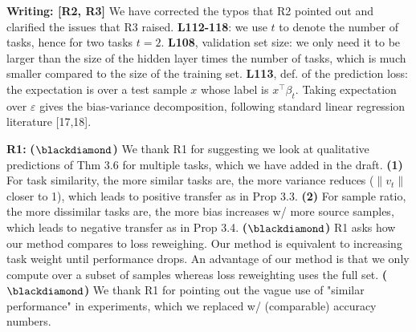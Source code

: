 \documentclass{article}
\begin{document}
\vspace{-0.025in}
\textbf{Writing: [R2, R3]}
We have corrected the typos that R2 pointed out and clarified the issues that R3 raised.
\textbf{L112-118}: we use $t$ to denote the number of tasks, hence for two tasks $t = 2$.
\textbf{L108}, validation set size: we only need it to be larger than the size of the hidden layer times the number of tasks, which is much smaller compared to the size of the training set.
\textbf{L113}, def. of the prediction loss: the expectation is over a test sample $x$ whose label is $x^{\top}\beta_t$.
Taking expectation over $\varepsilon$ gives  the bias-variance decomposition, following standard linear regression literature [17,18].

\vspace{-0.025in}
\textbf{R1:}
\textbf{($\blackdiamond$)} We thank R1 for suggesting we look at qualitative predictions of Thm 3.6 for multiple tasks, which we have added in the  draft.
\textbf{(1)} For task similarity, the more similar tasks are, the more variance reduces ($\|{v_t}\|$ closer to 1), which leads to positive transfer as in Prop 3.3.
\textbf{(2)} For sample ratio, the more dissimilar tasks are, the more bias increases w/ more source samples, which leads to negative transfer as in Prop 3.4.
\textbf{($\blackdiamond$)} R1 asks how our method compares to loss reweighing.
Our method is equivalent to increasing task weight until performance drops.
An advantage of our method is that we only compute over a subset of samples whereas loss reweighting uses the full set.
\textbf{($\blackdiamond$)} We thank R1 for pointing out the vague use of "similar performance" in experiments, which we replaced w/ (comparable) accuracy numbers. %
\end{document}
